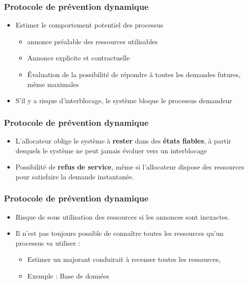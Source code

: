 \begin{frame}
\frametitle{Protocole de prévention dynamique}
\begin{itemize}
\item <1-> Estimer le comportement potentiel des processus
\begin{itemize}
\item annonce préalable des ressources utilisables
\item Annonce explicite et contractuelle
\item Évaluation de la possibilité de répondre à toutes les demandes futures, même maximales
\end{itemize}
\item <2-> S’il y a risque d’interblocage, le système bloque le processus demandeur
\end{itemize}
\end{frame}

\begin{frame}
\frametitle{Protocole de prévention dynamique}
\begin{itemize}
\item L'allocateur oblige le système à \textbf{rester} dans des \textbf{états fiables}, à partir desquels le système ne peut jamais évoluer vers un interblocage
\item Possibilité de \textbf{refus de service}, même si l'allocateur dispose des ressources pour satisfaire la demande instantanée.
\end{itemize}
\end{frame}

\begin{frame}
\frametitle{Protocole de prévention dynamique}
\begin{itemize}
\item Risque de sous utilisation des ressources si les annonces sont inexactes.
\item Il n'est pas toujours possible de connaître toutes les ressources qu'un processus va utiliser :
\begin{itemize}
\item Estimer un majorant conduirait à recenser toutes les ressources,
\item Exemple : Base de données
\end{itemize}
\end{itemize}
\end{frame}

